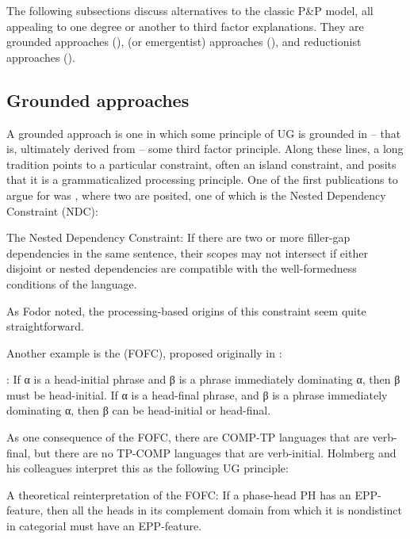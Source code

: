 \documentclass[output=paper,
modfonts
]{LSP/langsci}
\begin{document}
The following subsections discuss alternatives to the classic P\&P
model, all appealing to one degree or another to third factor
explanations. They are grounded approaches (),  (or
emergentist) approaches (), and reductionist approaches ().

\subsection{Grounded approaches}\label{sec:newmeyer:7.1}
A grounded approach is one in which some principle of UG is grounded in
 --  that is, ultimately derived from  --  some third factor principle.
Along these lines, a long tradition points to a particular constraint,
often an island constraint, and posits that it is a grammaticalized
processing principle. One of the first publications to argue for
 was \citet{fodor1978}, where two  are
posited, one of which is the Nested Dependency Constraint (NDC):

\ea The Nested Dependency Constraint: If there are two or more
filler-gap dependencies in the same sentence, their scopes may not
intersect if either disjoint or nested dependencies are compatible with
the well-formedness conditions of the language.
\z

As Fodor noted, the processing-based origins of this constraint seem
quite straightforward.

Another example is the  (FOFC), proposed
originally in \citet{holmberg2000}:

\ea {}: If α is a head-initial phrase and β is
a phrase immediately dominating α, then β must be head-initial. If α is
a head-final phrase, and β is a phrase immediately dominating α, then β
can be head-initial or head-final.
\z

As one consequence of the FOFC, there are COMP-TP languages that are
verb-final, but there are no TP-COMP languages that are verb-initial.
Holmberg and his colleagues interpret this  as the following
UG principle:

\ea \label{ex:newmeyer:7} A theoretical reinterpretation of the FOFC: If a phase-head PH has
an EPP-feature, then all the heads in its complement domain from which
it is nondistinct in categorial  must have an EPP-feature. \citep[13]{biberauer2008}
\z 
\end{document}
